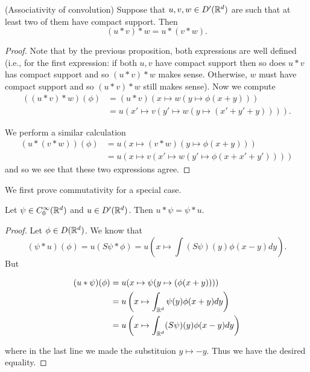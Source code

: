 \documentclass[twoside, a4paper, 10pt]{amsart}
\begin{document}
\begin{thm}(Associativity of convolution) Suppose that $u,v,w \in D'(\mathbb{R}^d)$ are such that at least two of them have compact support. Then $$(u * v) * w = u * (v * w).$$

\end{thm}

\begin{proof} Note that by the previous proposition, both expressions are well defined (i.e., for the first expression: if both $u,v$ have compact support then so does $u*v$ has compact support and so $(u*v)*w$ makes sense. Otherwise, $w$ must have compact support and so $(u*v)*w$ still makes sense). Now we compute  \begin{align*} ((u*v)*w)(\phi) &= (u*v)(x \mapsto w(y \mapsto \phi(x+y))) \\
&= u(x' \mapsto v(y' \mapsto w(y \mapsto (x'+y'+y)))).   \end{align*} 

We perform a similar calculation \begin{align*} (u*(v*w)) (\phi) &= u(x \mapsto (v*w)(y \mapsto \phi(x+y))) \\
&= u (x \mapsto v(x' \mapsto w(y' \mapsto \phi(x+x'+y')))) \end{align*} and so we see that these two expressions agree. \end{proof}

We first prove commutativity for a special case.

\begin{lemma} Let $\psi \in C_0^{\infty}(\mathbb{R}^d)$ and $u \in D'(\mathbb{R}^d)$. Then $u * \psi = \psi * u$.

\end{lemma}

\begin{proof} Let $\phi \in D(\mathbb{R}^d)$. We know that $$(\psi * u)(\phi) = u(S\psi * \phi) = u\left(x \mapsto \int (S\psi)(y) \phi(x-y) dy \right).$$ But 

\begin{align*} (u*\psi)(\phi) &= u(x \mapsto \psi(y \mapsto (\phi(x+y)))) \\ &= u\left( x \mapsto \int_{\mathbb{R}^d} \psi(y)\phi(x+y) dy \right) \\ &= u\left( x \mapsto \int_{\mathbb{R}^d} (S\psi)(y)\phi(x-y) dy \right)  \end{align*} 

where in the last line we made the substituion $y \mapsto -y$. Thus we have the desired equality. \end{proof}
\end{document}
